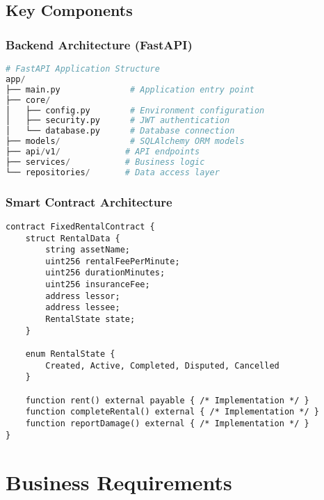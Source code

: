 \documentclass[11pt,a4paper]{article}
\begin{document}
\subsection{Key Components}

\subsubsection{Backend Architecture (FastAPI)}
\begin{lstlisting}[language=Python, caption=Core Backend Structure]
# FastAPI Application Structure
app/
├── main.py              # Application entry point
├── core/
│   ├── config.py        # Environment configuration
│   ├── security.py      # JWT authentication
│   └── database.py      # Database connection
├── models/              # SQLAlchemy ORM models
├── api/v1/             # API endpoints
├── services/           # Business logic
└── repositories/       # Data access layer
\end{lstlisting}

\subsubsection{Smart Contract Architecture}
\begin{lstlisting}[language=Solidity, caption=Rental Contract Core]
contract FixedRentalContract {
    struct RentalData {
        string assetName;
        uint256 rentalFeePerMinute;
        uint256 durationMinutes;
        uint256 insuranceFee;
        address lessor;
        address lessee;
        RentalState state;
    }
    
    enum RentalState {
        Created, Active, Completed, Disputed, Cancelled
    }
    
    function rent() external payable { /* Implementation */ }
    function completeRental() external { /* Implementation */ }
    function reportDamage() external { /* Implementation */ }
}
\end{lstlisting}

\section{Business Requirements}
\end{document}
